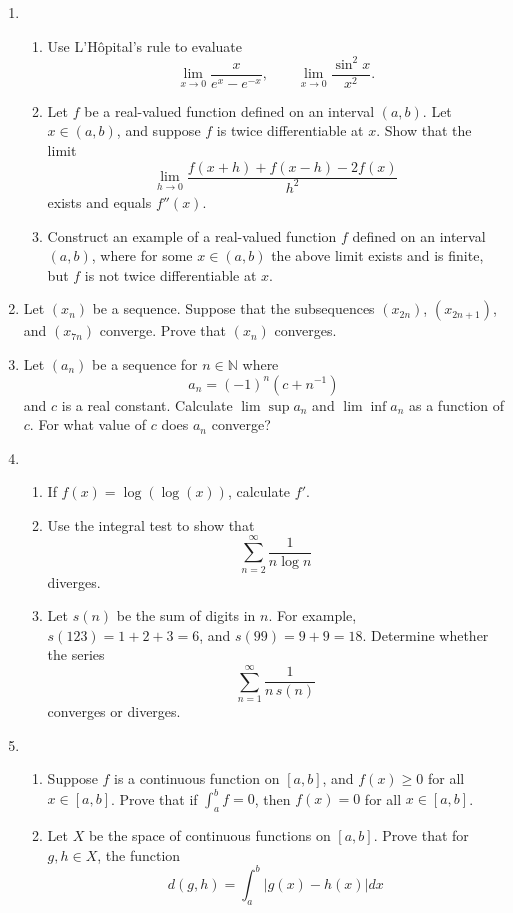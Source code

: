 \documentclass[12pt]{article}
\newcommand{\N}{\mathbb{N}}
\begin{document}
\begin{enumerate}
  \item
    \begin{enumerate}
      \item Use L'H\^opital's rule to evaluate
	\[
	\lim_{x\to 0} \frac{x}{e^{x}-e^{-x}}, \qquad
	\lim_{x\to 0} \frac{\sin^2 x}{x^2}.
	\]
      \item Let $f$ be a real-valued function defined on an interval $(a,b)$.
	Let $x\in(a,b)$, and suppose $f$ is twice differentiable at $x$.
	Show that the limit
	\[
	\lim_{h\to 0} \frac{f(x+h)+f(x-h) - 2f(x)}{h^2}
	\]
	exists and equals $f''(x)$.
      \item Construct an example of a real-valued function $f$ defined on an
	interval $(a,b)$, where for some $x\in (a,b)$ the above limit exists
	and is finite, but $f$ is not twice differentiable at $x$.
    \end{enumerate}
  \item Let $(x_n)$ be a sequence. Suppose that the subsequences $(x_{2n})$,
    $(x_{2n+1})$, and $(x_{7n})$ converge. Prove that $(x_n)$ converges.
  \item Let $(a_n)$ be a sequence for $n\in \N$ where
    \[
      a_n= (-1)^n (c+n^{-1})
    \]
    and $c$ is a real constant. Calculate $\lim \sup a_n$ and $\lim \inf
    a_n$ as a function of $c$. For what value of $c$ does $a_n$ converge?
  \item
    \begin{enumerate}
      \item If $f(x)=\log(\log(x))$, calculate $f'$.
      \item Use the integral test to show that
        \[
          \sum_{n=2}^\infty \frac{1}{n \log n}
        \]
        diverges.
      \item Let $s(n)$ be the sum of digits in $n$. For example,
        $s(123)=1+2+3=6$, and $s(99)=9+9=18$. Determine whether
        the series
        \[
          \sum_{n=1}^\infty \frac{1}{n\,s(n)}
        \]
        converges or diverges.
    \end{enumerate}
  \item
    \begin{enumerate}
      \item Suppose $f$ is a continuous function on $[a,b]$, and $f(x)\ge 0$
        for all $x\in[a,b]$. Prove that if $\int_a^b f = 0$, then $f(x)=0$ for
        all $x\in[a,b]$.
      \item Let $X$ be the space of continuous functions on $[a,b]$. Prove
        that for $g,h\in X$, the function
        \[
          d(g,h) = \int_a^b |g(x)-h(x)| dx
\]
\end{enumerate}
\end{enumerate}
\end{document}
